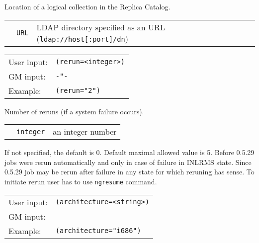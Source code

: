   Location of a logical collection in the Replica Catalog.

  \begin{tabular}{llp{10cm}}
    \hspace*{1cm}&\texttt{URL} & LDAP directory specified as an URL (\verb#ldap://host[:port]/dn#)\\
  \end{tabular}

  \hspace*{0.5cm}
  \begin{shaded}
  \end{shaded}
  \begin{tabular}{lp{13cm}}
    User input:&\verb#(rerun=<integer>)#\\
    GM input:&\verb#-"-#\\
    Example:&\verb#(rerun="2")#\\
  \end{tabular}

  Number of reruns (if a system failure occurs).

  \begin{tabular}{llp{10cm}}
    \hspace*{1cm}&\texttt{integer}  & an integer number\\
  \end{tabular}
    
  If not specified, the default is 0. Default maximal allowed value is
  5. Before 0.5.29 jobs were rerun automatically and only in case of
  failure in INLRMS state. Since 0.5.29 job may be rerun after failure
  in any state for which reruning has sense. To initiate rerun user
  has to use \texttt{ngresume} command.

  \hspace*{0.5cm}
  \begin{shaded}
  \end{shaded}
  \begin{tabular}{lp{13cm}}
    User input:&\verb#(architecture=<string>)#\\
    GM input:&\\
    Example:&\verb#(architecture="i686")#\\
  \end{tabular}

